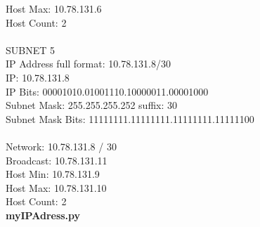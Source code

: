 \documentclass[10pt, a4paper]{article}%
\begin{document}
Host Max: 10.78.131.6\\
Host Count: 2\\
\\
SUBNET 5\\
IP Address full format: 10.78.131.8/30\\
IP: 10.78.131.8\\
IP Bits: 00001010.01001110.10000011.00001000\\
Subnet Mask: 255.255.255.252 suffix: 30\\
Subnet Mask Bits: 11111111.11111111.11111111.11111100\\
\\
Network: 10.78.131.8 / 30\\
Broadcast: 10.78.131.11\\
Host Min: 10.78.131.9\\
Host Max: 10.78.131.10\\
Host Count: 2\\

\noindent  \textbf{myIPAdress.py}

\end{document}
